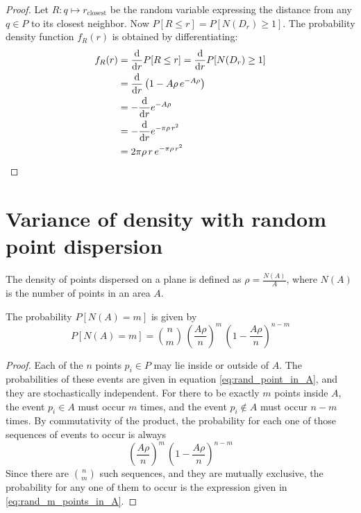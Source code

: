 \begin{proof}
Let $R : q \mapsto r_{\text{closest}}$ be the random variable expressing the distance from any $q \in P$ to its closest neighbor. Now $P[R \leq r] = P[N(D_{r}) \geq 1]$. The probability density function $f_R(r)$ is obtained by differentiating:
\begin{equation}
\begin{align}
f_R(r)
& = \frac{\mathrm{d}}{\mathrm{d} r} P[R \leq r] = \frac{\mathrm{d}}{\mathrm{d} r} P[N(D_{r}) \geq 1]\\
& = \frac{\mathrm{d}}{\mathrm{d} r} \left( 1 - A \rho \, e^{-A \rho} \right)\\
& = - \frac{\mathrm{d}}{\mathrm{d} r} e^{-A \rho}\\
& = - \frac{\mathrm{d}}{\mathrm{d} r} e^{-\pi \rho \, r^2}\\
& = 2 \pi \rho \, r \, e^{-\pi \rho \, r^2}
\end{align}
\end{equation}
\end{proof}




\section{Variance of density with random point dispersion}  \label{sec:proof_var_rand_pt_disp}
The density of points dispersed on a plane is defined as $\rho = \frac{N(A)}{A}$, where $N(A)$ is the number of points in an area $A$.

The probability $P[N(A) = m]$ is given by
\begin{equation} \label{eq:rand_m_points_in_A}
P[N(A) = m] = \binom{n}{m} \, \left( \frac{A \rho}{n} \right)^m \, \left( 1 - \frac{A \rho}{n} \right)^{n-m}
\end{equation}

\begin{proof}
Each of the $n$ points $p_i \in P$ may lie inside or outside of $A$. The probabilities of these events are given in equation \ref{eq:rand_point_in_A}, and they are stochastically independent. For there to be exactly $m$ points inside $A$, the event $p_i \in A$ must occur $m$ times, and the event $p_i \notin A$ must occur $n - m$ times.
By commutativity of the product, the probability for each one of those sequences of events to occur is always
\begin{equation}
\left( \frac{A \rho}{n} \right)^m \, \left( 1 - \frac{A \rho}{n} \right)^{n-m}
\end{equation}
Since there are $\binom{n}{m}$ such sequences, and they are mutually exclusive, the probability for any one of them to occur is the expression given in \ref{eq:rand_m_points_in_A}.
\end{proof}

